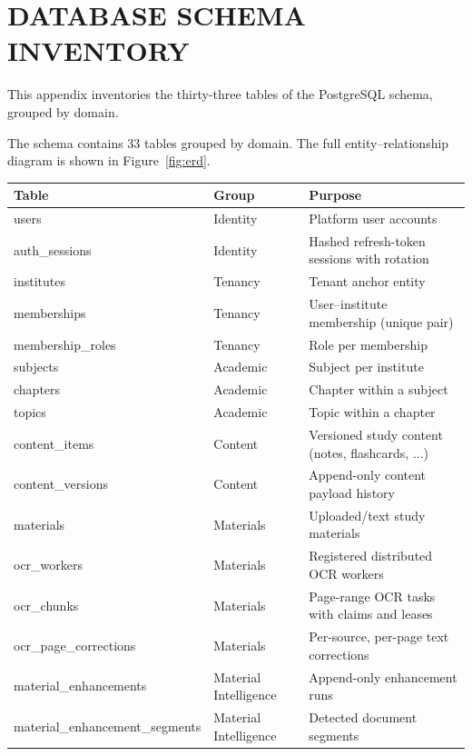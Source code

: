 \chapter{DATABASE SCHEMA INVENTORY}
\thispagestyle{empty}

This appendix inventories the thirty-three tables of the PostgreSQL schema,
grouped by domain.

\clearpage

The schema contains 33 tables grouped by domain. The full entity--relationship
diagram is shown in Figure~\ref{fig:erd}.

\begin{longtable}{@{}p{5.4cm}p{3.4cm}p{\dimexpr\textwidth-8.8cm-24pt\relax}@{}}
\toprule
\textbf{Table} & \textbf{Group} & \textbf{Purpose} \\
\midrule
\endhead
users & Identity & Platform user accounts \\
auth\_sessions & Identity & Hashed refresh-token sessions with rotation \\
institutes & Tenancy & Tenant anchor entity \\
memberships & Tenancy & User--institute membership (unique pair) \\
membership\_roles & Tenancy & Role per membership \\
subjects & Academic & Subject per institute \\
chapters & Academic & Chapter within a subject \\
topics & Academic & Topic within a chapter \\
content\_items & Content & Versioned study content (notes, flashcards, ...) \\
content\_versions & Content & Append-only content payload history \\
materials & Materials & Uploaded/text study materials \\
ocr\_workers & Materials & Registered distributed OCR workers \\
ocr\_chunks & Materials & Page-range OCR tasks with claims and leases \\
ocr\_page\_corrections & Materials & Per-source, per-page text corrections \\
material\_\hspace{0pt}enhancements & Material Intelligence & Append-only enhancement runs \\
material\_\hspace{0pt}enhancement\_\hspace{0pt}segments & Material Intelligence & Detected document segments \\

\end{longtable}
